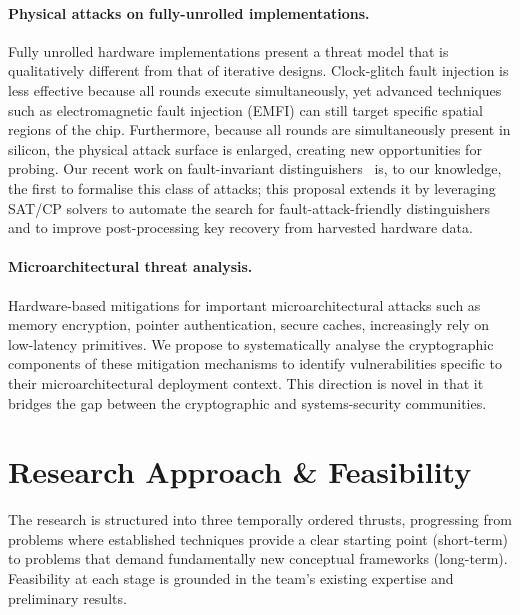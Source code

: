 \paragraph{Physical attacks on fully-unrolled implementations.}
Fully unrolled hardware implementations present a threat model that is qualitatively different from that of iterative designs.
Clock-glitch fault injection is less effective because all rounds execute simultaneously, yet advanced techniques such as electromagnetic fault injection (EMFI) can still target specific spatial regions of the chip.
Furthermore, because all rounds are simultaneously present in silicon, the physical attack surface is enlarged, creating new opportunities for probing.
Our recent work on fault-invariant distinguishers~ is, to our knowledge, the first to formalise this class of attacks; this proposal extends it by leveraging SAT/CP solvers to automate the search for fault-attack-friendly distinguishers and to improve post-processing key recovery from harvested hardware data.

\paragraph{Microarchitectural threat analysis.}
Hardware-based mitigations for important microarchitectural attacks such as memory encryption, pointer authentication, secure caches, increasingly rely on low-latency primitives.
We propose to systematically analyse the cryptographic components of these mitigation mechanisms to identify vulnerabilities specific to their microarchitectural deployment context.
This direction is novel in that it bridges the gap between the cryptographic and systems-security communities.

\section{Research Approach \& Feasibility}

The research is structured into three temporally ordered thrusts, progressing from problems where established techniques provide a clear starting point (short-term) to problems that demand fundamentally new conceptual frameworks (long-term).
Feasibility at each stage is grounded in the team's existing expertise and preliminary results.

